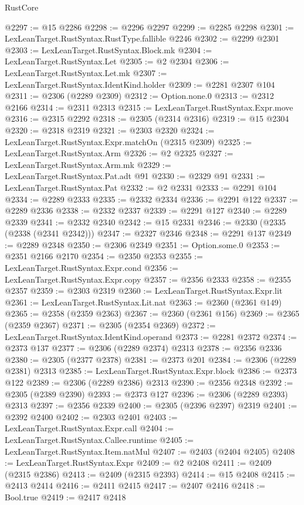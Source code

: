 \begin{lexlean}{RustCore}
\begin{coremodule}
@2297 := @15 @2286
@2298 := @2296 @2297
@2299 := @2285 @2298
@2301 := LexLeanTarget.RustSyntax.RustType.fallible @2246
@2302 := @2299 @2301
@2303 := LexLeanTarget.RustSyntax.Block.mk
@2304 := LexLeanTarget.RustSyntax.Let
@2305 := @2 @2304
@2306 := LexLeanTarget.RustSyntax.Let.mk
@2307 := LexLeanTarget.RustSyntax.IdentKind.holder
@2309 := @2281 @2307 @104
@2311 := @2306 (@2289 @2309)
@2312 := Option.none.{0}
@2313 := @2312 @2166
@2314 := @2311 @2313
@2315 := LexLeanTarget.RustSyntax.Expr.move
@2316 := @2315 @2292
@2318 := @2305 (@2314 @2316)
@2319 := @15 @2304
@2320 := @2318 @2319
@2321 := @2303 @2320
@2324 := LexLeanTarget.RustSyntax.Expr.matchOn (@2315 @2309)
@2325 := LexLeanTarget.RustSyntax.Arm
@2326 := @2 @2325
@2327 := LexLeanTarget.RustSyntax.Arm.mk
@2329 := LexLeanTarget.RustSyntax.Pat.adt @91
@2330 := @2329 @91
@2331 := LexLeanTarget.RustSyntax.Pat
@2332 := @2 @2331
@2333 := @2291 @104
@2334 := @2289 @2333
@2335 := @2332 @2334
@2336 := @2291 @122
@2337 := @2289 @2336
@2338 := @2332 @2337
@2339 := @2291 @127
@2340 := @2289 @2339
@2341 := @2332 @2340
@2342 := @15 @2331
@2346 := @2330 (@2335 (@2338 (@2341 @2342)))
@2347 := @2327 @2346
@2348 := @2291 @137
@2349 := @2289 @2348
@2350 := @2306 @2349
@2351 := Option.some.{0}
@2353 := @2351 @2166 @2170
@2354 := @2350 @2353
@2355 := LexLeanTarget.RustSyntax.Expr.cond
@2356 := LexLeanTarget.RustSyntax.Expr.copy
@2357 := @2356 @2333
@2358 := @2355 @2357
@2359 := @2303 @2319
@2360 := LexLeanTarget.RustSyntax.Expr.lit
@2361 := LexLeanTarget.RustSyntax.Lit.nat
@2363 := @2360 (@2361 @149)
@2365 := @2358 (@2359 @2363)
@2367 := @2360 (@2361 @156)
@2369 := @2365 (@2359 @2367)
@2371 := @2305 (@2354 @2369)
@2372 := LexLeanTarget.RustSyntax.IdentKind.operand
@2373 := @2281 @2372
@2374 := @2373 @137
@2377 := @2306 (@2289 @2374) @2313
@2378 := @2356 @2336
@2380 := @2305 (@2377 @2378)
@2381 := @2373 @201
@2384 := @2306 (@2289 @2381) @2313
@2385 := LexLeanTarget.RustSyntax.Expr.block
@2386 := @2373 @122
@2389 := @2306 (@2289 @2386) @2313
@2390 := @2356 @2348
@2392 := @2305 (@2389 @2390)
@2393 := @2373 @127
@2396 := @2306 (@2289 @2393) @2313
@2397 := @2356 @2339
@2400 := @2305 (@2396 @2397) @2319
@2401 := @2392 @2400
@2402 := @2303 @2401
@2403 := LexLeanTarget.RustSyntax.Expr.call
@2404 := LexLeanTarget.RustSyntax.Callee.runtime
@2405 := LexLeanTarget.RustSyntax.Item.natMul
@2407 := @2403 (@2404 @2405)
@2408 := LexLeanTarget.RustSyntax.Expr
@2409 := @2 @2408
@2411 := @2409 (@2315 @2386)
@2413 := @2409 (@2315 @2393)
@2414 := @15 @2408
@2415 := @2413 @2414
@2416 := @2411 @2415
@2417 := @2407 @2416
@2418 := Bool.true
@2419 := @2417 @2418

\end{coremodule}
\end{lexlean}
